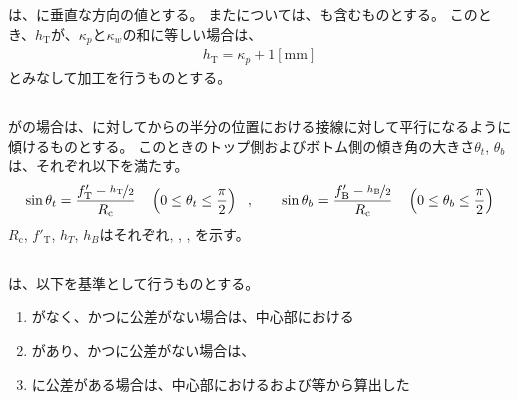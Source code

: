 \subsection{\OutcutLengthDimension}
\OutcutLengthDimension は、\EndFace に垂直な方向の値とする。
また\TopOutcutLength については、\KeywayWidthDimension も含むものとする。
このとき、\TopOutcutLength$h_\mathrm T$が、\KeywayPos$\kappa_p$と\KeywayWidth$\kappa_w$の和に等しい場合は、
\begin{align*}
  h_\mathrm T = \kappa_p+1[\text{mm}]
\end{align*}
とみなして加工を行うものとする。


\subsection{\CurvedOutcutDimension}
\Outcut が\CurvedOutcut の場合は、\CenterCurvatureLine に対して\EndFace から\OutcutLength の半分の位置における接線に対して平行になるように傾けるものとする。
このときのトップ側およびボトム側の傾き角の大きさ$\theta_t$, $\theta_b$は、それぞれ以下を満たす。
\begin{align*}
  \sin\theta_t = \frac{f_\mathrm T'-\nicefrac{h_\mathrm T}2}{R_\mathrm c}
  \quad\left(0 \leq \theta_t \leq \frac\pi2\right)~~,\qquad
  \sin\theta_b = \frac{f_\mathrm B'-\nicefrac{h_\mathrm B}2}{R_\mathrm c}
  \quad\left(0 \leq \theta_b \leq \frac\pi2\right)
\end{align*}
$R_\mathrm c$, $f'_\mathrm T$, $h_T$, $h_B$はそれぞれ\CenterCurvatureRadius, \TopReAlocationLength, \TopOutcutLength, \BottomOutcutLength を示す。



\clearpage


\subsection{\KeywayMillingReferencePoint}
\KeywayMillingReferencePoint は、以下を基準として行うものとする。
\begin{enumerate}[label=\sarrow]
\item \TopOutcut がなく、かつ\AsideKeywayDepth に公差がない場合は、\KeywayWidth 中心部における\CurvatureCenter
\item \TopOutcut があり、かつ\AsideKeywayDepth に公差がない場合は、\TopOutcutCenter
\item \AsideKeywayDepth に公差がある場合は、\KeywayWidth 中心部における\AsideKeywayDepth および\KeywayDiameter 等から算出した\KeywayCenter
\end{enumerate}


